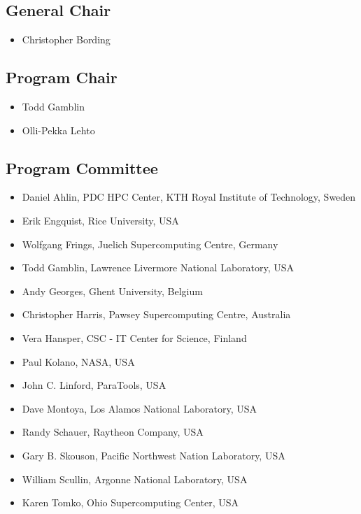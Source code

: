 \documentclass[11pt,a4paper]{article}
\begin{document}
\subsection{General Chair}
\begin{itemize}
\item Christopher Bording
\end{itemize}
\subsection{Program Chair}

\begin{itemize}
\item Todd Gamblin
\item Olli-Pekka Lehto
\end{itemize}

\subsection{Program Committee}

\begin{itemize}
\item Daniel Ahlin, PDC HPC Center, KTH Royal Institute of Technology, Sweden
\item Erik Engquist, Rice University, USA
\item Wolfgang Frings, Juelich Supercomputing Centre, Germany
\item Todd Gamblin, Lawrence Livermore National Laboratory, USA
\item Andy Georges, Ghent University, Belgium
\item Christopher Harris, Pawsey Supercomputing Centre, Australia
\item Vera Hansper, CSC - IT Center for Science, Finland
\item Paul Kolano, NASA, USA
\item John C. Linford, ParaTools, USA
\item Dave Montoya, Los Alamos National Laboratory, USA
\item Randy Schauer, Raytheon Company, USA
\item Gary B. Skouson, Pacific Northwest Nation Laboratory, USA
\item William Scullin, Argonne National Laboratory, USA
\item Karen Tomko, Ohio Supercomputing Center, USA
\end{itemize}
\end{document}
